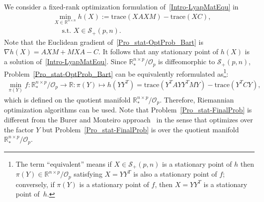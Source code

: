 \documentclass[11pt]{article}
\numberwithin{equation}{section}
\begin{document}
We consider a fixed-rank optimization formulation of~\eqref{Intro-LyapMatEqu} in~\cite{Bart10}
\begin{equation} 
  \begin{aligned} \label{Pro_stat-OptProb_Bart}
   & \min_{X\in \mathbb{R}^{n\times n}} h(X) :=\mathrm{trace}(XAXM) - \mathrm{trace}(XC), \\ 
   &\quad \text{ s.t. } X\in \mathcal{S}_+(p,n).
  \end{aligned}
\end{equation}
Note that the Euclidean gradient of~\eqref{Pro_stat-OptProb_Bart} is $\nabla h(X)=AXM + MXA - C.$ It follows that any stationary point of $h(X)$ is a solution of~\eqref{Intro-LyapMatEqu}. Since $\mathbb{R}_*^{n \times p} / \mathcal{O}_p$ is diffeomorphic to $\mathcal{S}_+(p, n)$, Problem~\eqref{Pro_stat-OptProb_Bart} can be equivalently reformulated as\footnote{The term ``equivalent'' means if $X\in \mathcal{S}_+(p,n)$ is a stationary point of $h$ then $\pi(Y)\in \mathbb{R}^{n\times p}/\mathcal{O}_p$ satisfying $X=YY^T$ is also a stationary point of $f$; conversely, if $\pi(Y)$ is a stationary point of $f$, then $X=YY^T$ is a stationary point of~$h$.}: 
\begin{equation}
  \begin{aligned} \label{Pro_stat-FinalProb} %
    \min_{\pi(Y)} f: \mathbb{R}_*^{n\times p}/\mathcal{O}_p \rightarrow \mathbb{R} :  \pi(Y) \mapsto h(YY^T)=\mathrm{trace}(Y^TAYY^TMY) - \mathrm{trace}(Y^TCY),
  \end{aligned}
\end{equation}
which is defined on the quotient manifold $\mathbb{R}_*^{n\times p}/\mathcal{O}_p$. Therefore, Riemannian optimization algorithms can be used. Note that Problem~\eqref{Pro_stat-FinalProb} is different from the Burer and Monteiro approach~\cite{Burer2003} in the sense that \cite{Burer2003} optimizes over the factor $Y$ but Problem~\eqref{Pro_stat-FinalProb} is over the quotient manifold~$\mathbb{R}_*^{n\times p}/\mathcal{O}_p$.
\end{document}
